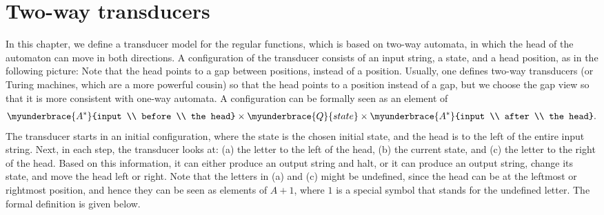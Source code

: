 \section{Two-way  transducers}
\label{sec:2dfa}

In this chapter, we define a transducer model for the regular functions, which is based on two-way automata, in which the head of the automaton can move in both directions. A configuration of the transducer consists of an input string, a state, and a head position, as in the following picture:
Note that the head points to a gap between positions, instead of a position. Usually, one defines two-way transducers (or Turing machines, which are a more powerful cousin) so that the head points to a position instead of a gap, but we choose the gap view so that it is more consistent with one-way automata. A configuration can be formally seen as an element of 
\begin{align*}
\myunderbrace{A^*}{input \\ before \\ the head}
\times 
\myunderbrace{Q}{state}
\times 
\myunderbrace{A^*}{input \\ after \\ the head}.\end{align*}
The transducer starts in an initial configuration, where the state is the chosen initial state, and the head is to the left of the entire input string. Next, in each step, the transducer looks at: (a) the letter to the left of the head, (b) the current state, and (c) the letter to the right of the head. Based on this information, it can either produce an output string and halt, or it can produce an output string, change its state, and move the head left or right. Note that the letters in (a) and (c) might be undefined, since the head can be at the leftmost or rightmost position, and hence they can be seen as elements of $A+1$, where $1$ is a special symbol that stands for the undefined letter. The formal definition is given below.
